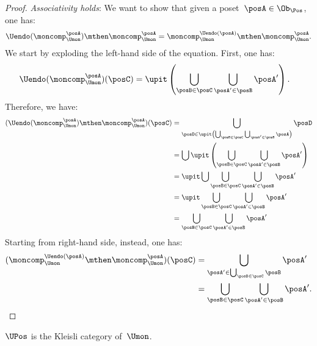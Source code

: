 \begin{proof}
    \emph{Associativity holds}: We want to show that given a poset~$\posA\in \Ob_\Pos$, one has:
    \begin{equation}
        \Uendo(\moncomp_{\Umon}^{\posA})\mthen \moncomp_{\Umon}^{\posA}= \moncomp_{\Umon}^{\Uendo(\posA)}\mthen \moncomp_{\Umon}^{\posA}.
    \end{equation}
    We start by exploding the left-hand side of the equation. First, one has:
    \begin{equation*}
        \begin{aligned}
            \Uendo(\moncomp_{\Umon}^{\posA})(\posC)&=\upit \left( \bigcup_{\posB\in \posC}\bigcup_{\posA'\in \posB} \posA'\right).
        \end{aligned}
    \end{equation*}
    Therefore, we have:
    \begin{equation*}
        \begin{aligned}
        (\Uendo(\moncomp_{\Umon}^{\posA})\mthen \moncomp_{\Umon}^{\posA})(\posC)
            &=\bigcup_{\posD \in \upit \left( \bigcup_{\posB\in \posC}\bigcup_{\posA'\in \posB} \posA\right)} \posD\\
            &=\bigcup \upit \left( \bigcup_{\posB\in \posC}\bigcup_{\posA'\in \posB} \posA'\right)\\
            &=\upit \bigcup \bigcup_{\posB\in \posC}\bigcup_{\posA'\in \posB} \posA'\\
            &=\upit  \bigcup_{\posB\in \posC}\bigcup_{\posA'\in \posB} \posA'\\
            &= \bigcup_{\posB\in \posC}\bigcup_{\posA'\in \posB} \posA'
        \end{aligned}
    \end{equation*}
    Starting from right-hand side, instead, one has:
    \begin{equation*}
        \begin{aligned}
        (\moncomp_{\Umon}^{\Uendo(\posA)}\mthen \moncomp_{\Umon}^{\posA})(\posC)
            &=\bigcup_{\posA'\in \bigcup_{\posB\in \posC}\posB}\posA'\\
            &=\bigcup_{\posB\in \posC}\bigcup_{\posA'\in \posB} \posA'.
        \end{aligned}
    \end{equation*}
\end{proof}

\begin{lemma}
    \label{lem:uposkleisli}
    $\UPos$ is the Kleisli category of~$\Umon$.
\end{lemma}
